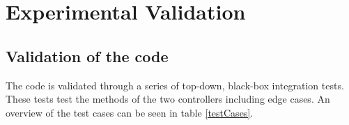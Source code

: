
\chapter{Experimental Validation} %

\label{Chapter6} %


\section{Validation of the code}
The code is validated through a series of top-down, black-box integration tests. These tests test the methods of the two controllers including edge cases. An overview of the test cases can be seen in table \ref{testCases}.


